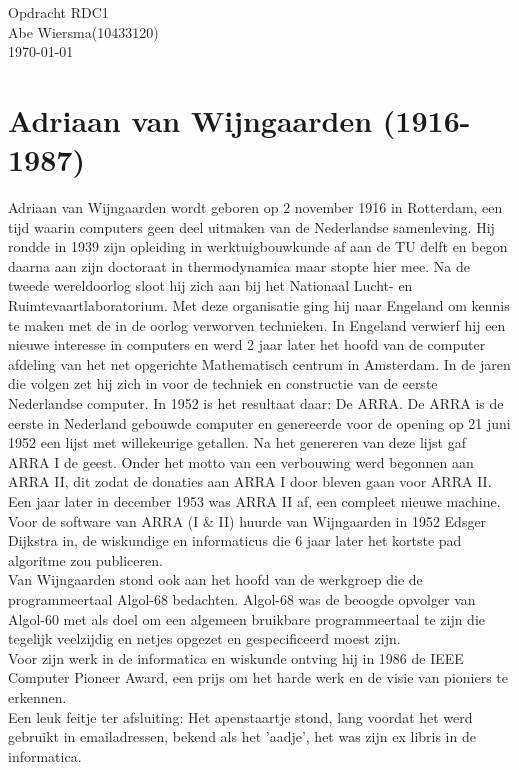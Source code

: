 \documentclass[pdftex,12pt,a4paper]{article}
\begin{document}
\noindent Opdracht RDC1\\ 
Abe Wiersma(10433120)\\
\today
\section*{Adriaan van Wijngaarden (1916-1987)}
Adriaan van Wijngaarden wordt geboren op 2 november 1916 in Rotterdam, een tijd waarin computers geen deel uitmaken van de Nederlandse samenleving. Hij rondde in 1939 zijn opleiding in werktuigbouwkunde af aan de TU delft en begon daarna aan zijn doctoraat in thermodynamica maar stopte hier mee. Na de tweede wereldoorlog sloot hij zich aan bij het Nationaal Lucht- en Ruimtevaartlaboratorium. Met deze organisatie ging hij naar Engeland om kennis te maken met de in de oorlog verworven technieken. In Engeland verwierf hij een nieuwe interesse in computers en werd 2 jaar later het hoofd van de computer afdeling van het net opgerichte Mathematisch centrum in Amsterdam. In de jaren die volgen zet hij zich in voor de techniek en constructie van de eerste Nederlandse computer. In 1952 is het resultaat daar: De ARRA. De ARRA is de eerste in Nederland gebouwde computer en genereerde voor de opening op 21 juni 1952 een lijst met willekeurige getallen. Na het genereren van deze lijst gaf ARRA I de geest. Onder het motto van een verbouwing werd begonnen aan ARRA II, dit zodat de donaties aan ARRA I door bleven gaan voor ARRA II. Een jaar later in december 1953 was ARRA II af, een compleet nieuwe machine.\\
Voor de software van ARRA (I \& II) huurde van Wijngaarden in 1952 Edsger Dijkstra in, de wiskundige en informaticus die 6 jaar later het kortste pad algoritme zou publiceren.\\
Van Wijngaarden stond ook aan het hoofd van de werkgroep die de programmeertaal Algol-68 bedachten.
Algol-68 was de beoogde opvolger van Algol-60 met als doel om een algemeen bruikbare programmeertaal te zijn die tegelijk veelzijdig en netjes opgezet en gespecificeerd moest zijn.\\
Voor zijn werk in de informatica en wiskunde ontving hij in 1986 de IEEE Computer Pioneer Award, een prijs om het harde werk en de visie van pioniers te erkennen.\\
Een leuk feitje ter afsluiting: Het apenstaartje stond, lang voordat het werd gebruikt in emailadressen, bekend als het 'aadje', het was zijn ex libris in de informatica.
\end{document}
